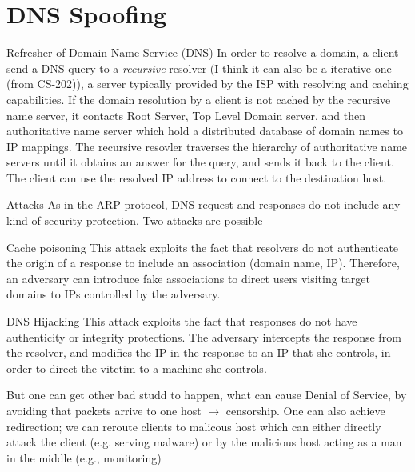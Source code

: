\section{DNS Spoofing}
\begin{parag}{Refresher of Domain Name Service (DNS)}
    In order to resolve a domain, a client send a DNS query to a \textit{recursive} resolver (I think it can also be a iterative one (from CS-202)), a server typically provided by the ISP with resolving and caching capabilities. If the domain resolution by a client is not cached by the recursive name server, it contacts Root Server, Top Level Domain server, and then authoritative name server which hold a distributed database of domain names to IP mappings. The recursive resovler traverses the hierarchy of authoritative name servers until it obtains an answer for the query, and sends it back to the client. The client can use the resolved IP address to connect to the destination host.
\end{parag}
\begin{parag}{Attacks}
    As in the ARP protocol, DNS request and responses do not include any kind of security protection. Two attacks are possible
	\begin{subparag}{Cache poisoning}
	    This attack exploits the fact that resolvers do not authenticate the origin of a response to include an association (domain name, IP). Therefore, an adversary can introduce fake associations to direct users visiting target domains to IPs controlled by the adversary.
	\end{subparag}
	\begin{subparag}{DNS Hijacking}
	    This attack exploits the fact that responses do not have authenticity or integrity protections. The adversary intercepts the response from the resolver, and modifies the IP in the response to an IP that she controls, in order to direct the vitctim to a machine she controls.
	\end{subparag}
	But one can get other bad studd to happen, what can cause Denial of Service, by avoiding that packets arrive to one host $\to$ censorship. One can also achieve redirection; we can reroute clients to malicous host which can either directly attack the client (e.g. serving malware) or by the malicious host acting as a man in the middle (e.g., monitoring)
\end{parag}

